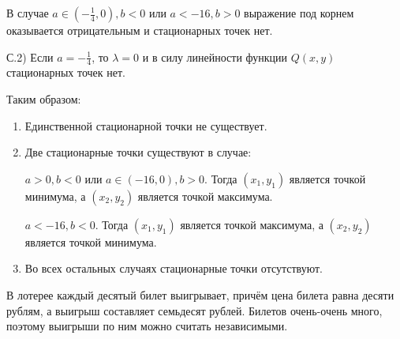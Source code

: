 \documentclass[addpoints, answers]{exam} %
\begin{document}
\begin{questions}
\begin{solution}
В случае $a\in \left(-\frac{1}{4} ,0\right),b<0$ или $a<-16,b>0$ выражение под корнем оказывается отрицательным и стационарных точек нет.

С.2) Если $a=-\frac{1}{4} $, то $\lambda =0$ и в силу линейности функции $Q(x,y)$ стационарных точек нет. 



Таким образом:

\begin{enumerate}
\item  Единственной стационарной точки не существует.

\item  Две стационарные точки существуют в случае:


$a>0,b<0$ или $a\in \left(-16,0\right),b>0$. Тогда $\left(x_{1} ,y_{1} \right)$ является точкой минимума, а $\left(x_{2} ,y_{2} \right)$ является точкой максимума.

$a<-16,b<0$. Тогда $\left(x_{1} ,y_{1} \right)$ является точкой максимума, а $\left(x_{2} ,y_{2} \right)$ является точкой минимума.

\item Во всех остальных случаях стационарные точки отсутствуют.
\end{enumerate}



\end{solution}

\question В лотерее каждый десятый билет выигрывает, причём цена билета равна десяти рублям, а выигрыш составляет семьдесят рублей. Билетов очень-очень много, поэтому выигрыши по ним можно считать независимыми.
\end{questions}
\end{document}
